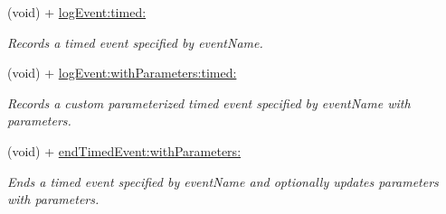 \begin{Indent}
\begin{DoxyCompactItemize}
(void) + \hyperlink{interfaceFlurry_ad1beb2e7875ce565f74b35d973f9fe42}{log\+Event\+:timed\+:}
\begin{DoxyCompactList}\small\item\em Records a timed event specified by {\ttfamily event\+Name}. \end{DoxyCompactList}\item 
(void) + \hyperlink{interfaceFlurry_a66eeaeb9725692dc354fdd350c691cfc}{log\+Event\+:with\+Parameters\+:timed\+:}
\begin{DoxyCompactList}\small\item\em Records a custom parameterized timed event specified by {\ttfamily event\+Name} with {\ttfamily parameters}. \end{DoxyCompactList}\item 
(void) + \hyperlink{interfaceFlurry_a9540add7440d1b716bfb8fb8efa85801}{end\+Timed\+Event\+:with\+Parameters\+:}
\begin{DoxyCompactList}\small\item\em Ends a timed event specified by {\ttfamily event\+Name} and optionally updates parameters with {\ttfamily parameters}. \end{DoxyCompactList}\end{DoxyCompactItemize}
\end{Indent}
